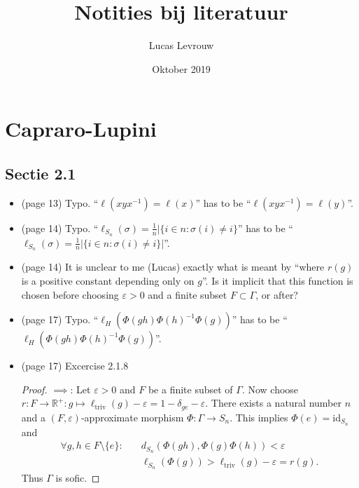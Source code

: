 \documentclass[11pt]{article}
\title{Notities bij literatuur}
\author{Lucas Levrouw}
\date{Oktober 2019}
\renewcommand{\epsilon}{\varepsilon}
\newcommand{\idperm}[1]{\mathrm{id}_{S_#1}}
\begin{document}
\maketitle

\section{Capraro-Lupini}

\subsection{Sectie 2.1}


\begin{itemize}

\item (page 13) Typo. ``$\ell\left(x y x^{-1}\right)=\ell(x)$'' has to be ``$\ell\left(x y x^{-1}\right)=\ell(y)$''.

\item (page 14) Typo. ``$\ell_{S_{n}}(\sigma)=\frac{1}{n} |\{i \in n: \sigma(i) \neq i\}$'' has to be ``$\ell_{S_{n}}(\sigma)=\frac{1}{n} |\{i \in n: \sigma(i) \neq i\}|$''.

\item (page 14) It is unclear to me (Lucas) exactly what is meant by ``where $r(g)$ is a positive constant depending only on $g$''. Is it implicit that this function is chosen before choosing $\epsilon > 0$ and a finite subset $F \subset \Gamma$, or after?

\item (page 17) Typo. ``$\ell_{H}\left(\Phi(g h) \Phi(h)^{-1} \Phi(g)\right)$'' has to be ``$\ell_{H}\left(\Phi(g h) \Phi(h)^{-1} \Phi(g)\right)$''.

\item (page 17) Excercise 2.1.8
\begin{proof}
\underline{$\implies$}: Let $\epsilon > 0$ and $F$ be a finite subset of $\Gamma$. Now choose $r: F \to \mathbb R^+: g \mapsto \ell_{\text{triv}}(g) - \epsilon = 1- \delta_{ge} - \epsilon$.
There exists a natural number $n$ and a $(F, \epsilon)$-approximate morphism $\Phi: \Gamma \to S_n$. This implies $\Phi(e) = \idperm{n}$ and
\begin{align*}
\forall g,h \in F \setminus \{e\} : &\quad d_{S_n}(\Phi(gh),\Phi(g)\Phi(h)) < \epsilon \\
									&\quad \ell_{S_n}(\Phi(g)) > \ell_{\text{triv}}(g)-\epsilon = r(g).
\end{align*}
Thus $\Gamma$ is sofic.


\end{proof}
\end{itemize}
\end{document}
